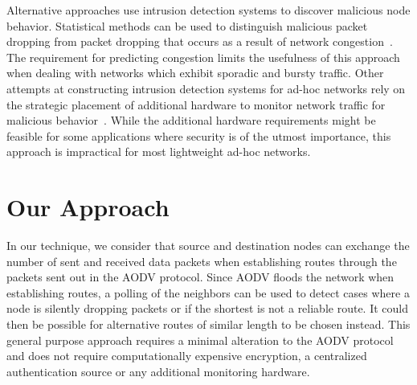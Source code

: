\documentclass[12pt,a4paper]{report}
\begin{document}
Alternative approaches use intrusion detection systems to discover malicious node behavior. Statistical methods can be used to distinguish malicious packet dropping from packet dropping that occurs as a result of network congestion~\cite{1258776}. The requirement for predicting congestion limits the usefulness of this approach when dealing with networks which exhibit sporadic and bursty traffic. Other attempts at constructing intrusion detection systems for ad-hoc networks rely on the strategic placement of additional hardware to monitor network traffic for malicious behavior~\cite{Tseng:2003:SID:986858.986876}. While the additional hardware requirements might be feasible for some applications where security is of the utmost importance, this approach is impractical for most lightweight ad-hoc networks.

\section{Our Approach}
In our technique, we consider that source and destination nodes can exchange the number of sent and received data packets when establishing routes through the packets sent out in the AODV protocol. Since AODV floods the network when establishing routes, a polling of the neighbors can be used to detect cases where a node is silently dropping packets or if the shortest is not a reliable route.  It could then be possible for alternative routes of similar length to be chosen instead. This general purpose approach requires a minimal alteration to the AODV protocol and does not require computationally expensive encryption, a centralized authentication source or any additional monitoring hardware.



\end{document}
